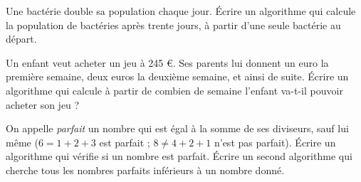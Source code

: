 \begin{exercice}
  Une bactérie double sa population chaque jour. Écrire un algorithme qui
  calcule la population de bactéries après trente jours, à partir d'une seule
  bactérie au départ.
\end{exercice}

\begin{exercice}
  Un enfant veut acheter un jeu à 245 \euro. Ses parents lui donnent un euro la
  première semaine, deux euros la deuxième semaine, et ainsi de suite. Écrire
  un algorithme qui calcule à partir de combien de semaine l'enfant va-t-il
  pouvoir acheter son jeu ?
\end{exercice}

\begin{exercice}
  On appelle \emph{parfait} un nombre qui est égal à la somme de ses diviseurs,
  sauf lui même ($6 = 1 + 2 + 3$ est parfait ; $8 \neq 4 + 2 + 1$ n'est pas
  parfait). Écrire un algorithme qui vérifie si un nombre est parfait. Écrire
  un second algorithme qui cherche tous les nombres parfaits inférieurs à un
  nombre donné.
\end{exercice}
